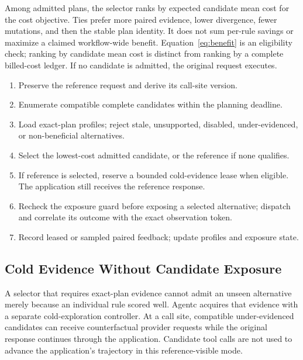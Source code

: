 Among admitted plans, the selector ranks by expected candidate mean cost for the
cost objective. Ties prefer more paired evidence, lower divergence, fewer mutations,
and then the stable plan identity. It does not sum per-rule savings or maximize a
claimed workflow-wide benefit. Equation~\ref{eq:benefit} is an eligibility check;
ranking by candidate mean cost is distinct from ranking by a complete billed-cost
ledger. If no candidate is admitted, the original request executes.

\begin{algorithm}[t]
\caption{Request-boundary selection and evidence acquisition}
\label{alg:selection}
\small
\begin{enumerate}[leftmargin=*,itemsep=2pt]
\item Preserve the reference request and derive its call-site version.
\item Enumerate compatible complete candidates within the planning deadline.
\item Load exact-plan profiles; reject stale, unsupported, disabled, under-evidenced,
or non-beneficial alternatives.
\item Select the lowest-cost admitted candidate, or the reference if none qualifies.
\item If reference is selected, reserve a bounded cold-evidence lease when eligible.
The application still receives the reference response.
\item Recheck the exposure guard before exposing a selected alternative; dispatch
and correlate its outcome with the exact observation token.
\item Record leased or sampled paired feedback; update profiles and exposure state.
\end{enumerate}
\end{algorithm}

\subsection{Cold Evidence Without Candidate Exposure}
\label{sec:exploration}

A selector that requires exact-plan evidence cannot admit an unseen alternative
merely because an individual rule scored well. Agentc acquires that evidence with
a separate cold-exploration controller. At a call site, compatible under-evidenced
candidates can receive counterfactual provider requests while the original response
continues through the application. Candidate tool calls are not used to advance
the application's trajectory in this reference-visible mode.

